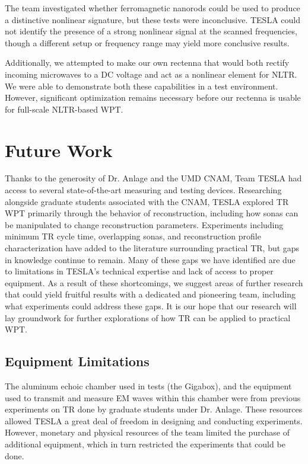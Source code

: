 The team investigated whether ferromagnetic nanorods could be used to produce a distinctive nonlinear signature, but these tests were inconclusive. TESLA could not identify the presence of a strong nonlinear signal at the scanned frequencies, though a different setup or frequency range may yield more conclusive results. 

Additionally, we attempted to make our own rectenna that would both rectify incoming microwaves to a DC voltage and act as a nonlinear element for NLTR. We were able to demonstrate both these capabilities in a test environment. However, significant optimization remains necessary before our rectenna is usable for full-scale NLTR-based WPT.


\section{Future Work}

Thanks to the generosity of Dr. Anlage and the UMD CNAM, Team TESLA had access to several state-of-the-art measuring and testing devices. Researching alongside graduate students associated with the CNAM, TESLA explored TR WPT primarily through the behavior of reconstruction, including how sonas can be manipulated to change reconstruction parameters.  Experiments including minimum TR cycle time, overlapping sonas, and reconstruction profile characterization have added to the literature surrounding practical TR, but gaps in knowledge continue to remain.  Many of these gaps we have identified are due to limitations in TESLA's technical expertise and lack of  access to proper equipment.  As a result of these shortcomings, we suggest areas of further research that could yield fruitful results with a dedicated and pioneering team, including what experiments could address these gaps.  It is our hope that our research will lay groundwork for further explorations of how TR can be applied to practical WPT.

\subsection{Equipment Limitations}

The aluminum echoic chamber used in tests (the Gigabox), and the equipment used to transmit and measure EM waves within this chamber were from previous experiments on TR done by graduate students under Dr. Anlage.  These resources allowed TESLA a great deal of freedom in designing and conducting experiments.  However, monetary and physical resources of the team limited the purchase of additional equipment, which in turn restricted the experiments that could be done.

